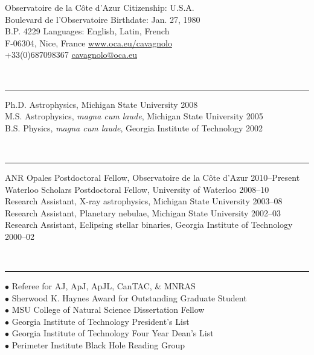 \documentclass[12pt]{cv}
\begin{document}
\begin{center}
{\Large{}}\vspace{-0.3cm}
\end{center}
Observatoire de la C\^ote d'Azur \hfill Citizenship: U.S.A.\\
Boulevard de l'Observatoire \hfill Birthdate: Jan. 27\ths, 1980\\
B.P. 4229 \hfill Languages: English, Latin, French\\
F-06304, Nice, France \hfill \href{http://www.oca.eu/~cavagnolo/}{www.oca.eu/cavagnolo}\\
+33(0)687098367 \hfill \href{mailto:cavagnolo@oca.eu}{cavagnolo@oca.eu}

{\large{}}\vspace{-0.3cm}\\
\rule{\linewidth}{0.5pt}
Ph.D. Astrophysics, Michigan State University \hfill 2008\\
M.S. Astrophysics, \textit{magna cum laude}, Michigan State University \hfill 2005\\
B.S. Physics, \textit{magna cum laude}, Georgia Institute of Technology \hfill 2002

{\large{}}\vspace{-0.3cm}\\
\rule{\linewidth}{0.5pt}
ANR Opales Postdoctoral Fellow, Observatoire de la C\^ote d'Azur \hfill 2010--Present\\
Waterloo Scholars Postdoctoral Fellow, University of Waterloo \hfill 2008--10\\
Research Assistant, X-ray astrophysics, Michigan State University \hfill 2003--08\\
Research Assistant, Planetary nebulae, Michigan State University \hfill 2002--03\\
Research Assistant, Eclipsing stellar binaries, Georgia Institute of Technology \hfill 2000--02

{\large{}}\vspace{-0.3cm}\\
\rule{\linewidth}{0.5pt}
{\scriptsize{$\bullet$}} Referee for AJ, ApJ, ApJL, CanTAC, \& MNRAS\\
{\scriptsize{$\bullet$}} Sherwood K. Haynes Award for Outstanding Graduate Student\\
{\scriptsize{$\bullet$}} MSU College of Natural Science Dissertation Fellow\\
{\scriptsize{$\bullet$}} Georgia Institute of Technology President's List\\
{\scriptsize{$\bullet$}} Georgia Institute of Technology Four Year Dean's List\\
{\scriptsize{$\bullet$}} Perimeter Institute Black Hole Reading Group
\end{document}

